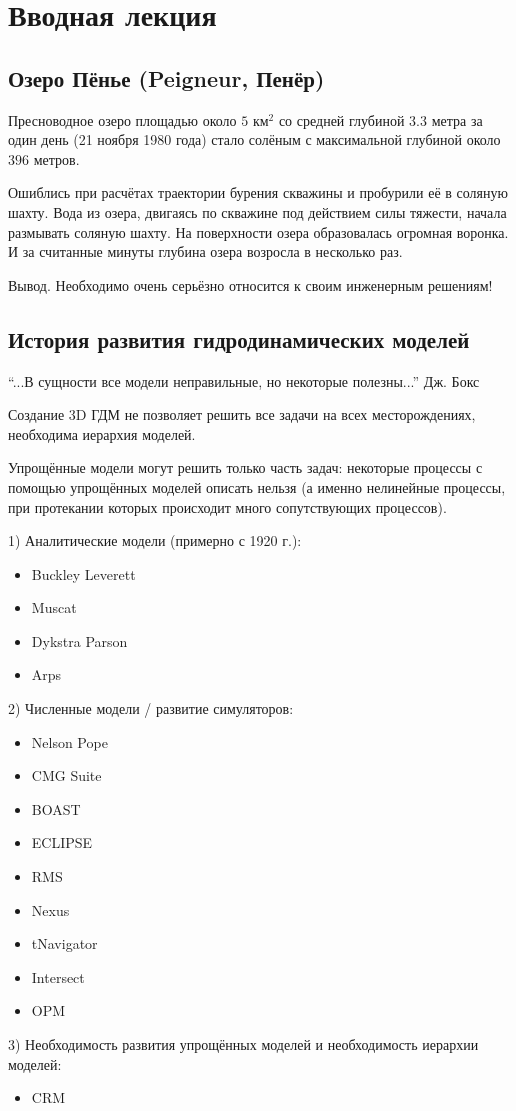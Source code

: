 \documentclass[main.tex]{subfiles}
\begin{document}

\section{Вводная лекция}

\subsection{Озеро Пёнье (Peigneur, Пенёр)}

Пресноводное озеро площадью около $5\text{ км}^2$ со средней глубиной $3.3$ метра за один день (21 ноября 1980 года) стало солёным с максимальной глубиной около $396$ метров.

Ошиблись при расчётах траектории бурения скважины и пробурили её в соляную шахту. 
Вода из озера, двигаясь по скважине под действием силы тяжести, начала размывать соляную шахту.
На поверхности озера образовалась огромная воронка. И за считанные минуты глубина озера возросла в несколько раз.

Вывод. Необходимо очень серьёзно относится к своим инженерным решениям!

\subsection{История развития гидродинамических моделей}

\enquote{...В сущности все модели неправильные, но некоторые полезны...} Дж. Бокс

Создание 3D ГДМ не позволяет решить все задачи на всех месторождениях, необходима иерархия моделей.

Упрощённые модели могут решить только часть задач: некоторые процессы с помощью упрощённых моделей описать нельзя (а именно нелинейные процессы, при протекании которых происходит много сопутствующих процессов).

1) Аналитические модели (примерно с 1920 г.):
\begin{itemize}
	\item Buckley Leverett
	\item Muscat
	\item Dykstra Parson
	\item Arps
\end{itemize}
2) Численные модели / развитие симуляторов:
\begin{itemize}
	\item Nelson Pope
	\item CMG Suite
	\item BOAST
	\item ECLIPSE
	\item RMS
	\item Nexus
	\item tNavigator
	\item Intersect
	\item OPM
\end{itemize}
3) Необходимость развития упрощённых моделей и необходимость иерархии моделей:
\begin{itemize}
	\item CRM
\end{itemize}
\end{document}
